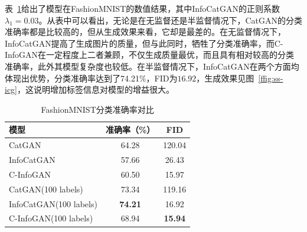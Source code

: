 表~\ref{tab:fashion}给出了模型在FashionMNIST的数值结果，其中InfoCatGAN的正则系数$\lambda_1 = 0.03$。从表中可以看出，无论是在无监督还是半监督情况下，CatGAN的分类准确率都是比较高的，但从生成效果来看，它却是最差的。在无监督情况下，InfoCatGAN提高了生成图片的质量，但与此同时，牺牲了分类准确率，而C-InfoGAN在一定程度上二者兼顾，不仅生成质量最优，而且具有相对较高的分类准确率，此外其模型复杂度也较低。在半监督情况下，InfoCatGAN在两个方面均体现出优势，分类准确率达到了74.21\%，FID为$16.92$，生成效果见图~\ref{ffig:ss-icg}，这说明增加标签信息对模型的增益很大。

\begin{table}[htbp]
  \centering
  \caption{FashionMNIST分类准确率对比}
  \label{tab:fashion}
  \begin{tabular}{|l|c|c|}
    \hline
    \textbf{模型} & \textbf{准确率（\%）} & \textbf{FID} \\
    \hline
    CatGAN & 64.28 & 120.04  \\ \hline
    InfoCatGAN & 57.66 & 26.43 \\ \hline
    C-InfoGAN & 60.50 & 15.97 \\ \hline
    CatGAN(100 labels) & 73.34 & 119.16 \\ \hline
    InfoCatGAN(100 labels) & \textbf{74.21} & 16.92 \\ \hline
    C-InfoGAN(100 labels) & 68.94 & \textbf{15.94} \\ \hline
  \end{tabular}
\end{table}

